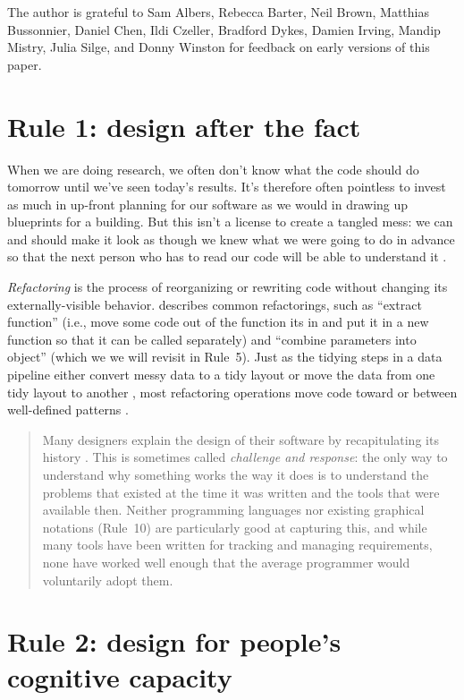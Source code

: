 \documentclass[10pt,letterpaper]{article}
\begin{document}
The author is grateful to Sam Albers,
Rebecca Barter,
Neil Brown,
Matthias Bussonnier,
Daniel Chen,
Ildi Czeller,
Bradford Dykes,
Damien Irving,
Mandip Mistry,
Julia Silge,
and Donny Winston
for feedback on early versions of this paper.

\section*{Rule 1: design after the fact}

When we are doing research,
we often don't know what the code should do tomorrow
until we've seen today's results.
It's therefore often pointless to invest as much in up-front planning for our software
as we would in drawing up blueprints for a building.
But this isn't a license to create a tangled mess:
we can and should make it look as though we knew what we were going to do in advance
so that the next person who has to read our code will be able to understand it \cite{Parnas1986}.

\emph{Refactoring} is the process of reorganizing or rewriting code
without changing its externally-visible behavior.
\cite{Fowler2018} describes common refactorings,
such as ``extract function''
(i.e., move some code out of the function its in
and put it in a new function so that it can be called separately)
and ``combine parameters into object''
(which we we will revisit in Rule~5).
Just as the tidying steps in a data pipeline
either convert messy data to a tidy layout or move the data from one tidy layout to another \cite{Wickham2017},
most refactoring operations move code toward or between well-defined patterns \cite{Kerievsky2004}.

\begin{quotation}
  \noindent
  Many designers explain the design of their software
  by recapitulating its history \cite{Brown2011,Brown2012}.
  This is sometimes called \emph{challenge and response}:
  the only way to understand why something works the way it does
  is to understand the problems that existed at the time it was written
  and the tools that were available then.
  Neither programming languages nor existing graphical notations (Rule~10)
  are particularly good at capturing this,
  and while many tools have been written for tracking and managing requirements,
  none have worked well enough that the average programmer would voluntarily adopt them.
\end{quotation}

\section*{Rule 2: design for people's cognitive capacity}
\end{document}
